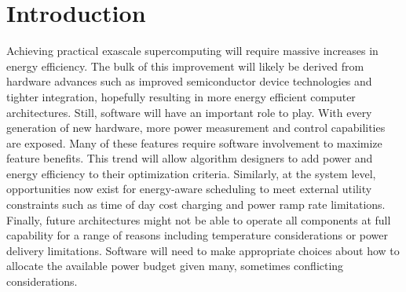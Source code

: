 \documentclass[12pt]{report} %
\providecommand{\DIFdelend}{} %
\DeclareRobustCommand{\DIFdelend}{\DIFOaddend \let\includegraphics\DIFOincludegraphics} %
\begin{document}


    \DIFdelend \chapter{Introduction}						%
	Achieving practical exascale supercomputing will require massive increases in energy efficiency.  
The bulk of this improvement will likely be derived from hardware advances such as improved semiconductor device technologies and tighter integration, hopefully resulting in more energy efficient computer architectures.  
Still, software will have an important role to play.  
With every generation of new hardware, more power measurement and control capabilities are exposed. 
Many of these features require software involvement to maximize feature benefits.
This trend will allow algorithm designers to add power and energy efficiency to their optimization criteria.  
Similarly, at the system level, opportunities now exist for energy-aware scheduling to meet external utility constraints such as time of day cost charging and power ramp rate limitations.  
Finally, future architectures might not be able to operate all components at full capability for a range of reasons including temperature considerations or power delivery limitations.
Software will need to make appropriate choices about how to allocate the available power budget given many, sometimes conflicting considerations.
\end{document}

